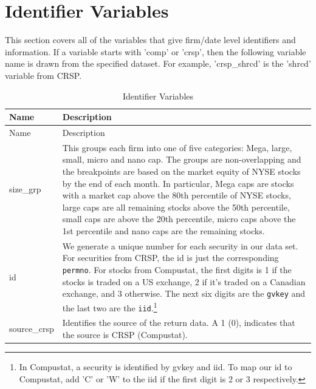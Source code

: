 \documentclass[12pt,title,fleqn]{article}
\begin{document}
    
\section{Identifier Variables}
This section covers all of the variables that give firm/date level identifiers and information. If a variable starts with 'comp' or 'crsp', then the following variable name is drawn from the specified dataset. For example, 'crsp\_shrcd' is the 'shrcd' variable from CRSP.

{\scriptsize
	\begin{longtable}{@{\extracolsep{\fill}}|l|m{14.2cm}|@{}}
	\caption{Identifier Variables \label{identification_var}}\\
	
	
	
	\hline
	Name & Description \\
	\hline
	\endfirsthead
	
	\hline
	Name & Description \\
	\hline
	\endhead
	
	\hline
	\endfoot
	
	
	\hline\hline
	\endlastfoot
	
		size\_grp & This groups each firm into one of five categories: Mega, large, small, micro and nano cap. The groups are non-overlapping and the breakpoints are based on the market equity of NYSE stocks by the end of each month. In particular, Mega caps are stocks with a market cap above the 80th percentile of NYSE stocks, large caps are all remaining stocks above the 50th percentile, small caps are above the 20th percentile, micro caps above the 1st percentile and nano caps are the remaining stocks. \\[1ex]
		
		id & We generate a unique number for each security in our data set. For securities from CRSP, the id is just the corresponding \texttt{permno}. For stocks from Compustat, the first digits is 1 if the stocks is traded on a US exchange, 2 if it's traded on a Canadian exchange, and 3 otherwise. The next six digits are the  \texttt{gvkey} and the last two are the \texttt{iid}.\footnote{In Compustat, a security is identified by gvkey and iid. To map our id to Compustat, add 'C' or 'W' to the iid if the first digit is 2 or 3 respectively.}  \\[1ex]
		
		source\_crsp & Identifies the source of the return data. A 1 (0), indicates that the source is CRSP (Compustat). \\[1ex]
		

\end{longtable}}
\end{document}

